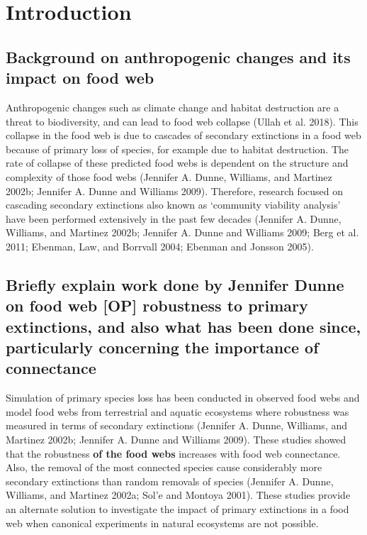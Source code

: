 \documentclass{article}
\begin{document}

\hypertarget{introduction}{%
\section{Introduction}\label{introduction}}

\hypertarget{background-on-anthropogenic-changes-and-its-impact-on-food-web}{%
\subsection{Background on anthropogenic changes and its impact on food
web}\label{background-on-anthropogenic-changes-and-its-impact-on-food-web}}

Anthropogenic changes such as climate change and habitat destruction are
a threat to biodiversity, and can lead to food web collapse (Ullah et
al. 2018). This collapse in the food web is due to cascades of secondary
extinctions in a food web because of primary loss of species, for
example due to habitat destruction. The rate of collapse of these
predicted food webs is dependent on the structure and complexity of
those food webs (Jennifer A. Dunne, Williams, and Martinez 2002b;
Jennifer A. Dunne and Williams 2009). Therefore, research focused on
cascading secondary extinctions also known as `community viability
analysis' have been performed extensively in the past few decades
(Jennifer A. Dunne, Williams, and Martinez 2002b; Jennifer A. Dunne and
Williams 2009; Berg et al. 2011; Ebenman, Law, and Borrvall 2004;
Ebenman and Jonsson 2005).

\hypertarget{briefly-explain-work-done-by-jennifer-dunne-on-food-web-op-robustness-to-primary-extinctions-and-also-what-has-been-done-since-particularly-concerning-the-importance-of-connectance}{%
\subsection{Briefly explain work done by Jennifer Dunne on food web
{[}OP{]} robustness to primary extinctions, and also what has been done
since, particularly concerning the importance of
connectance}\label{briefly-explain-work-done-by-jennifer-dunne-on-food-web-op-robustness-to-primary-extinctions-and-also-what-has-been-done-since-particularly-concerning-the-importance-of-connectance}}

Simulation of primary species loss has been conducted in observed food
webs and model food webs from terrestrial and aquatic ecosystems where
robustness was measured in terms of secondary extinctions (Jennifer A.
Dunne, Williams, and Martinez 2002b; Jennifer A. Dunne and Williams
2009). These studies showed that the robustness \textbf{of the food
webs} increases with food web connectance. Also, the removal of the most
connected species cause considerably more secondary extinctions than
random removals of species (Jennifer A. Dunne, Williams, and Martinez
2002a; Sol'e and Montoya 2001). These studies provide an alternate
solution to investigate the impact of primary extinctions in a food web
when canonical experiments in natural ecosystems are not possible.
\end{document}
